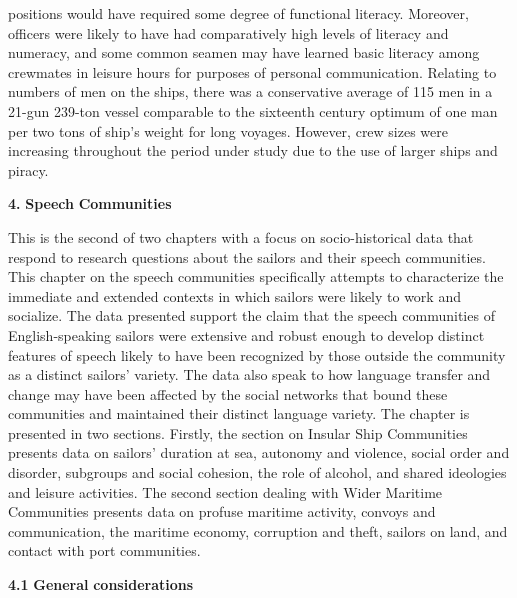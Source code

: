 positions would have required some degree of functional literacy. Moreover, officers were likely to have had comparatively high levels of literacy and numeracy, and some common seamen may have learned basic literacy among crewmates in leisure hours for purposes of personal communication. Relating to numbers of men on the ships, there was a conservative average of 115 men in a 21-gun 239-ton vessel comparable to the sixteenth century optimum of one man per two tons of ship’s weight for long voyages. However, crew sizes were increasing throughout the period under study due to the use of larger ships and piracy. 

\textbf{4.} \textbf{Speech} \textbf{Communities}

This is the second of two chapters with a focus on socio-historical data that respond to research questions about the sailors and their speech communities. This chapter on the speech communities specifically attempts to characterize the immediate and extended contexts in which sailors were likely to work and socialize. The data presented support the claim that the speech communities of English-speaking sailors were extensive and robust enough to develop distinct features of speech likely to have been recognized by those outside the community as a distinct sailors’ variety. The data also speak to how language transfer and change may have been affected by the social networks that bound these communities and maintained their distinct language variety. The chapter is presented in two sections. Firstly, the section on Insular Ship Communities presents data on sailors’ duration at sea, autonomy and violence, social order and disorder, subgroups and social cohesion, the role of alcohol, and shared ideologies and leisure activities. The second section dealing with Wider Maritime Communities presents data on profuse maritime activity, convoys and communication, the maritime economy, corruption and theft, sailors on land, and contact with port communities. 

\textbf{4.1} \textbf{General} \textbf{considerations}

